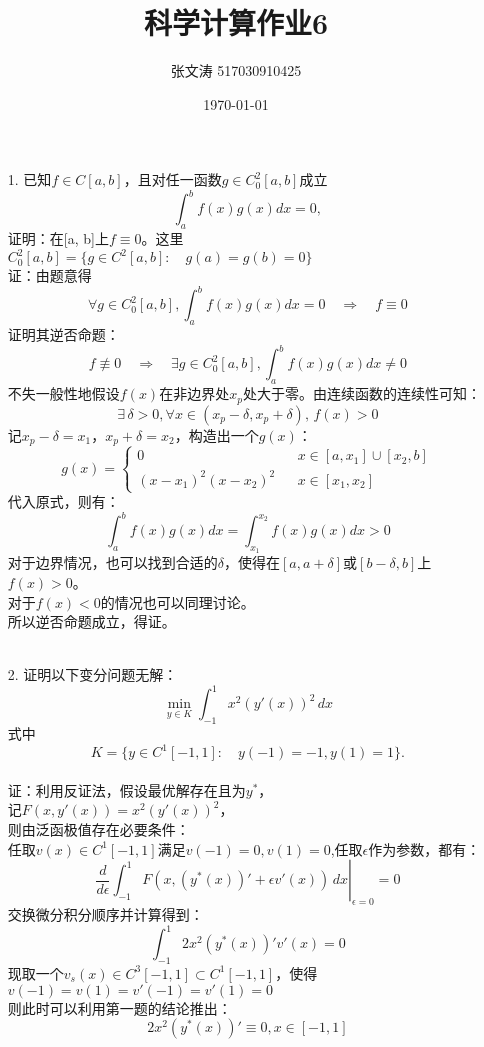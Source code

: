 \documentclass{article}
\title{科学计算作业6}
\author{张文涛 517030910425}
\date{\today}
\begin{document}
	\maketitle
	\begin{itemize}
		\item[1.]已知$f\in C[a, b]$，且对任一函数$g\in C_{0}^{2}[a ,b]$成立
		$$\int_{a}^{b}f(x)g(x)dx = 0,$$
		证明：在[a, b]上$f\equiv 0$。这里$C_{0}^{2}[a ,b] = \{g\in C ^{2}[a, b]:\quad g(a) = g(b) = 0\}$\\
		证：由题意得
		$$\forall g\in C_{0}^{2}[a ,b],\int_{a}^{b}f(x)g(x)dx = 0 \quad \Rightarrow \quad f\equiv 0$$
		证明其逆否命题：
		$$ f \not\equiv 0 \quad \Rightarrow \quad \exists g\in C_{0}^{2}[a ,b],\int_{a}^{b}f(x)g(x)dx \ne 0$$
		不失一般性地假设$f(x)$在非边界处$x_p$处大于零。由连续函数的连续性可知：
		$$\exists\, \delta > 0, \forall x \in (x_p - \delta, x_p + \delta),\, f(x) > 0$$
		记$x_p - \delta = x_1$，$x_p + \delta = x_2$，构造出一个$g(x)$：
		$$g(x) = \left\{
			\begin{array}{lcl}
			0 && x\in[a, x_1] \cup [x_2, b]\\
			(x - x_1)^2(x - x_2)^2 && x\in [x_1, x_2]
			\end{array}
		\right.$$
		代入原式，则有：
		$$\int_{a}^{b}f(x)g(x)dx  = \int_{x_1}^{x_2}f(x)g(x)dx > 0$$
		对于边界情况，也可以找到合适的$\delta$，使得在$[a, a + \delta]$或$[b - \delta, b]$上$f(x) > 0$。\\
		对于$f(x) < 0$的情况也可以同理讨论。\\
		所以逆否命题成立，得证。\\\\
		\item[2.]证明以下变分问题无解：
		$$\min\limits_{y \in K} \int_{-1}^{1}x^2(y'(x))^2\, dx$$
		式中
		$$K = \{y\in C^1[-1, 1]: \quad y(-1) = -1, y(1) = 1\}.$$\\
		证：利用反证法，假设最优解存在且为$y^*$，\\
		记$F(x, y'(x)) = x^2(y'(x))^2$，\\
		则由泛函极值存在必要条件：\\
		任取$v(x)\in C^1[-1,1]$满足$ v(-1) = 0, v(1) = 0$,任取$\epsilon$作为参数，都有：
		$$\left.\frac{d}{d\epsilon}\int_{-1}^{1}F(x,( y^{*}(x))' + \epsilon v'(x))\,dx\right|_{\epsilon = 0} = 0 $$
		交换微分积分顺序并计算得到：
		$$\int_{-1}^{1}2x^2(y^{*}(x))'v'(x) = 0$$
		现取一个$v_s(x) \in C^3[-1, 1] \subset C^1[-1 , 1]$，使得$v(-1) = v(1) = v'(-1) = v'(1) = 0$\\
		则此时可以利用第一题的结论推出：
		$$2x^2(y^*(x))' \equiv 0, x\in[-1, 1]$$

\end{itemize}
\end{document}
